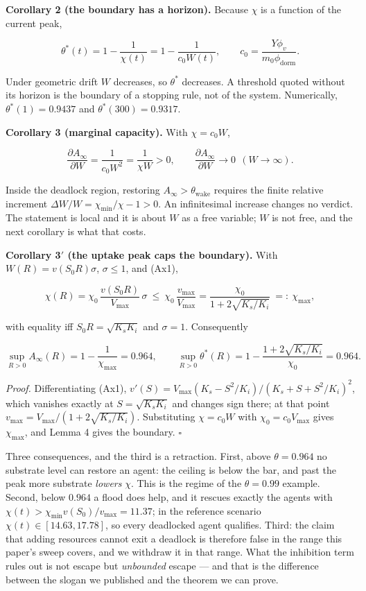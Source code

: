 \documentclass[11pt,a4paper]{article}
\begin{document}
\textbf{Corollary 2 (the boundary has a horizon).} Because \(\chi\) is a function of the
current peak,

\[
\theta^\ast(t)=1-\frac{1}{\chi(t)}=1-\frac{1}{c_0W(t)},
\qquad c_0=\frac{Y\phi_v}{m_0\phi_{\mathrm{dorm}}}.
\]

Under geometric drift \(W\) decreases, so \(\theta^\ast\) decreases. A threshold
quoted without its horizon is the boundary of a stopping rule, not of the system.
Numerically, \(\theta^\ast(1)=0.9437\) and \(\theta^\ast(300)=0.9317\).

\textbf{Corollary 3 (marginal capacity).} With \(\chi=c_0W\),

\[
\frac{\partial A_\infty}{\partial W}=\frac{1}{c_0W^2}=\frac{1}{\chi W}>0,
\qquad \frac{\partial A_\infty}{\partial W}\to0\ \ (W\to\infty).
\]

Inside the deadlock region, restoring \(A_\infty>\theta_{\mathrm{wake}}\) requires
the finite relative increment \(\Delta W/W=\chi_{\min}/\chi-1>0\). An infinitesimal
increase changes no verdict. The statement is local and it is about \(W\) as a free
variable; \(W\) is not free, and the next corollary is what that costs.

\textbf{Corollary 3\('\) (the uptake peak caps the boundary).} With \(W(R)=v(S_0R)\sigma\),
\(\sigma\le1\), and (Ax1),

\[
\chi(R)=\chi_0\,\frac{v(S_0R)}{V_{\max}}\,\sigma
\ \le\ \chi_0\,\frac{v_{\max}}{V_{\max}}
=\frac{\chi_0}{1+2\sqrt{K_s/K_i}}\ =:\ \chi_{\max},
\]

with equality iff \(S_0R=\sqrt{K_sK_i}\) and \(\sigma=1\). Consequently

\[
\sup_{R>0}A_\infty(R)=1-\frac{1}{\chi_{\max}}=0.964,
\qquad
\sup_{R>0}\theta^\ast(R)=1-\frac{1+2\sqrt{K_s/K_i}}{\chi_0}=0.964 .
\]

\emph{Proof.} Differentiating (Ax1),
\(v'(S)=V_{\max}(K_s-S^2/K_i)\big/(K_s+S+S^2/K_i)^2\), which vanishes exactly at
\(S=\sqrt{K_sK_i}\) and changes sign there; at that point
\(v_{\max}=V_{\max}/(1+2\sqrt{K_s/K_i})\). Substituting \(\chi=c_0W\) with
\(\chi_0=c_0V_{\max}\) gives \(\chi_{\max}\), and Lemma 4 gives the boundary.
\(\square\)

Three consequences, and the third is a retraction. First, above \(\theta=0.964\) no
substrate level can restore an agent: the ceiling is below the bar, and past the
peak more substrate \emph{lowers} \(\chi\). This is the regime of the \(\theta=0.99\)
example. Second, below \(0.964\) a flood does help, and it rescues exactly the agents
with \(\chi(t)>\chi_{\min}v(S_0)/v_{\max}=11.37\); in the reference scenario
\(\chi(t)\in[14.63,17.78]\), so every deadlocked agent qualifies. Third: the claim
that adding resources cannot exit a deadlock is therefore false in the range this
paper's sweep covers, and we withdraw it in that range. What the inhibition term
rules out is not escape but \emph{unbounded} escape --- and that is the difference between
the slogan we published and the theorem we can prove.
\end{document}
